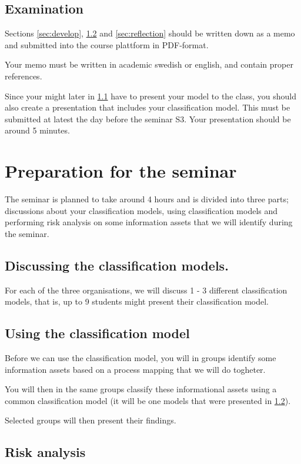 \documentclass[a4paper]{llncs}
\begin{document}
\subsection{Examination}
Sections \ref{sec:develop}, \ref{sec:use} and \ref{sec:reflection} should be
written down as a memo and submitted into the course plattform in PDF-format.

Your memo must be written in academic swedish or english, and contain proper
references.

Since your might later in \ref{sec:present} have to present your model to the
class, you should also create a presentation that includes your classification
model. This must be submitted at latest the day before the seminar S3. Your
presentation should be around 5 minutes.

\section{Preparation for the seminar}

The seminar is planned to take around 4 hours and is divided into three parts;
discussions about your classification models, using classification models and
performing risk analysis on some information assets that we will identify during
the seminar.

\subsection{Discussing the classification models.}
\label{sec:present}

For each of the three organisations, we will discuss 1 - 3 different
classification models, that is, up to 9 students might present their
classification model.

\subsection{Using the classification model}
\label{sec:use}

Before we can use the classification model, you will in groups identify some
information assets based on a process mapping that we will do togheter.

You will then in the same groups classify these informational assets using a
common classification model (it will be one models that were presented in
\ref{sec:use}).

Selected groups will then present their findings.

\subsection{Risk analysis}
\label{sec:risk}
\end{document}

